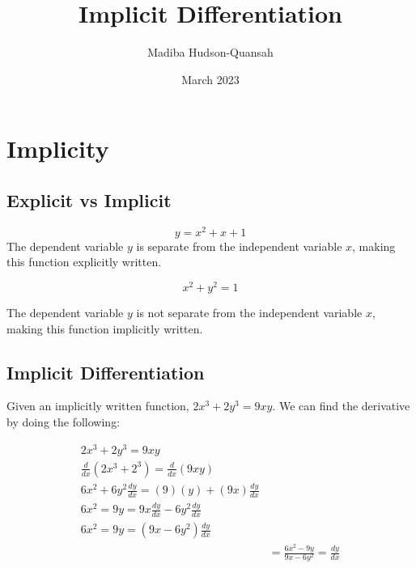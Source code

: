 \documentclass[12pt letter]{report}
\title{\Huge{Implicit Differentiation}}
\author{\huge{Madiba Hudson-Quansah}}
\date{March 2023}
\begin{document}
\maketitle
\newpage
{}
\tableofcontents
\pagebreak

\chapter{Implicity}
\section{Explicit vs Implicit}

\[
	y = x^2 +x+1
\]
The dependent variable $y$ is separate from the independent variable $x$, making this function explicitly written.

\[
	x^2+y^2 = 1
\]

The dependent variable $y$ is not separate from the independent variable $x$, making this function implicitly written.

\section{Implicit Differentiation}
Given an implicitly written function, $2x^3+2y^3 = 9xy$. We can find the derivative by doing the following:

\begin{align*}
	2x^3+2y^3 = 9xy                                       \\
	\frac{d}{dx}(2x^3+2^3) = \frac{d}{dx}(9xy)            \\
	6x^2 + 6y^2\frac{dy}{dx} = (9)(y) + (9x)\frac{dy}{dx} \\
	6x^2=9y = 9x\frac{dy}{dx} - 6y^2\frac{dy}{dx}         \\
	6x^2=9y= (9x-6y^2)\frac{dy}{dx}                       \\
	 & =  \frac{6x^2-9y}{9x-6y^2} = \frac{dy}{dx}
\end{align*}
\end{document}
